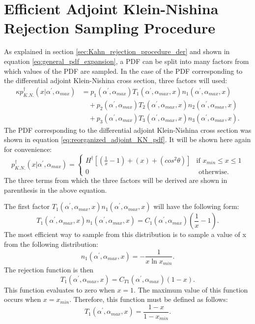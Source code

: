 \section{Efficient Adjoint Klein-Nishina Rejection Sampling Procedure}
As explained in section \ref{sec:Kahn_rejection_procedure_der} and shown in
equation \ref{eq:general_pdf_expansion}, a PDF can be split into many factors 
from which values of the PDF are sampled. In the case of the PDF corresponding 
to the differential adjoint Klein-Nishina cross section, three factors will 
used:
\begin{align}
  \kappa p_{K.N.}^{\dagger}(x|\alpha^{'},\alpha_{max}) & = 
  p_1(\alpha^{'},\alpha_{max})T_1(\alpha^{'},\alpha_{max},x)
  n_1(\alpha^{'},\alpha_{max},x) \nonumber \\
  & \quad + p_2(\alpha^{'},\alpha_{max})T_2(\alpha^{'},\alpha_{max},x)
  n_2(\alpha^{'},\alpha_{max},x) \nonumber \\
  & \quad + p_3(\alpha^{'},\alpha_{max})T_3(\alpha^{'},\alpha_{max},x)
  n_3(\alpha^{'},\alpha_{max},x). \nonumber 
\end{align}
The PDF corresponding to the differential adjoint Klein-Nishina cross section 
was shown in equation \ref{eq:reorganized_adjoint_KN_pdf}. It will be shown 
here again for convenience:
\begin{equation}
  p_{K.N.}^{\dagger}(x|\alpha^{'},\alpha_{max}) = 
  \begin{cases}
    H^{\dagger}\left[\left(\frac{1}{x} - 1 \right) + \left(x\right) + 
      \left(cos^2\theta\right) \right] 
    & \text{if } x_{min} \leq x \leq 1 \\
    0 & \text{ otherwise}.
  \end{cases}
\end{equation}
The three terms from which the three factors will be derived are shown in
parenthesis in the above equation. 

The first factor $T_1(\alpha^{'},\alpha_{max},x)n_1(\alpha^{'},\alpha_{max},x)$
will have the following form:
\begin{equation*}
  T_1(\alpha^{'},\alpha_{max},x)n_1(\alpha^{'},\alpha_{max},x) = 
  C_1(\alpha^{'},\alpha_{max})\left(\frac{1}{x}-1\right).
\end{equation*}
The most efficient way to sample from this distribution is to sample a value of
x from the following distribution:
\begin{equation}
  n_1(\alpha^{'},\alpha_{max},x) = -\frac{1}{x\ln{x_{min}}}.
\end{equation}
The rejection function is then 
\begin{equation*}
  T_1(\alpha^{'},\alpha_{max},x) = C_{T1}(\alpha^{'},\alpha_{max})(1-x).
\end{equation*}
This function evaluates to zero when $x=1$. The maximum value of this function
occurs when $x=x_{min}$. Therefore, this function must be defined as follows:
\begin{equation}
  T_1(\alpha^{'},\alpha_{max},x) = \frac{1-x}{1-x_{min}}.
\end{equation}

